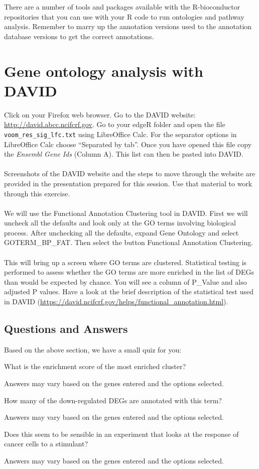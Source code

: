 \begin{note}There are a number of tools and packages available with the R-bioconductor repositories that you can use with your R code to run ontologies and pathway analysis. Remember to marry up the annotation versions used to the annotation database versions to get the correct annotations.
\end{note}

\section{Gene ontology analysis with DAVID}
Click on your Firefox web browser. Go to the DAVID website: \url{http://david.abcc.ncifcrf.gov}. Go to your edgeR folder and open the file \texttt{voom\_res\_sig\_lfc.txt} using LibreOffice Calc. For the separator options in LibreOffice Calc choose “Separated by tab”. Once you have opened this file copy the \emph{Ensembl Gene Ids} (Column A). This list can then be pasted into DAVID.\\\\
Screenshots of the DAVID website and the steps to move through the website are provided in the presentation prepared for this session. Use that material to work through this exercise.\\\\
We will use the Functional Annotation Clustering tool in DAVID. First we will uncheck all the defaults and look only at the GO terms involving biological process. After unchecking all the defaults, expand Gene Ontology and select GOTERM\_BP\_FAT. Then select the button Functional Annotation Clustering. \\\\
This will bring up a screen where GO terms are clustered.  Statistical testing is performed to assess whether the GO terms are more enriched in the list of DEGs than would be expected by chance. You will see a column of P\_Value and also adjusted P values.  Have a look at the brief description of the statistical test used in DAVID (\url{https://david.ncifcrf.gov/helps/functional_annotation.html}).

\subsection{Questions and Answers}
Based on the above section, we have a small quiz for you:
\begin{questions}
What is the enrichment score of the most enriched cluster?
\begin{answer}
Answers may vary based on the genes entered and the options selected.
\end{answer}
How many of the down-regulated DEGs are annotated with this term? 
\begin{answer}
Answers may vary based on the genes entered and the options selected.
\end{answer}
Does this seem to be sensible in an experiment that looks at the response of cancer cells to a stimulant?
\begin{answer}
Answers may vary based on the genes entered and the options selected.
\end{answer}
\end{questions}
